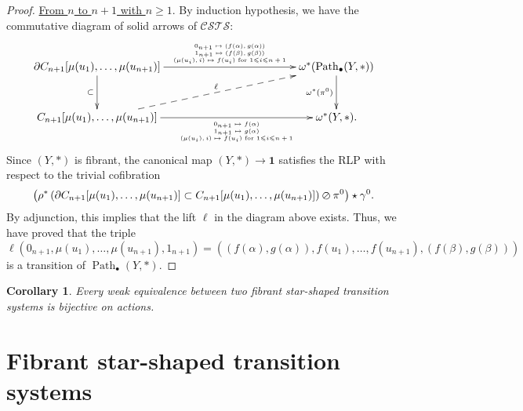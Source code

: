 \documentclass[a4paper,12pt]{amsart}
\newtheorem{cor}[thm]{Corollary}
\begin{document}
\begin{proof}
\underline{From $n$ to $n+1$ with $n{\geqslant} 1$}. By induction hypothesis, we have the
commutative diagram of solid arrows of ${\mathcal{C\!S\!T\!S}}$:
\[
\xymatrix@C=12em@R=3em
{
{\partial} C_{n+1}[\mu(u_1),\dots,\mu(u_{n+1})] {\ar@{->}[d]_-{{\subset}}} \ar@{->}[r]^-{\text{\tiny {\(\begin{array}{c}0_{n+1} \mapsto (f(\alpha),g(\alpha)) \\1_{n+1} \mapsto (f(\beta),g(\beta))\\ (\mu(u_i),i) \mapsto f(u_i) \hbox{ for }1{\leqslant} i {\leqslant} n+1\end{array}\)}}} & \omega^*(\operatorname{{Path}}_\bullet(Y,*)) {\ar@{->}[d]_-{{\omega^*(\pi^0)}}} \\ 
C_{n+1}[\mu(u_1),\dots,\mu(u_{n+1})] \ar@{-->}[ru]^-{\ell}\ar@{->}[r]_-{\text{\tiny {\(\begin{array}{c}0_{n+1} \mapsto f(\alpha) \\1_{n+1} \mapsto g(\alpha)\\(\mu(u_i),i) \mapsto f(u_i) \hbox{ for }1{\leqslant} i {\leqslant} n+1\end{array}\)}}} & \omega^*(Y,*).
}
\]
Since $(Y,*)$ is fibrant, the canonical map $(Y,*)\to \mathbf{1}$
satisfies the RLP with respect to the trivial
cofibration \[\left(\rho^*\left({\partial}
    C_{n+1}[\mu(u_1),\dots,\mu(u_{n+1})] \subset
    C_{n+1}[\mu(u_1),\dots,\mu(u_{n+1})]\right)\varoslash
  \pi^0\right)\star \gamma^0.\] By adjunction, this implies that the
lift $\ell$ in the diagram above exists.  Thus, we have proved that
the triple
\[\ell(0_{n+1},\mu(u_1),\dots,\mu(u_{n+1}),1_{n+1})=((f(\alpha),g(\alpha)),f(u_1),\dots,f(u_{n+1}),(f(\beta),g(\beta)))\]
is a transition of $\operatorname{{Path}}_\bullet(Y,*)$.  \end{proof}

\begin{cor} \label{hom-eq11} Every weak equivalence between two
  fibrant star-shaped transition systems is bijective on actions.
\end{cor}

\section{Fibrant star-shaped transition systems}
\label{fibrant-section}
\end{document}
